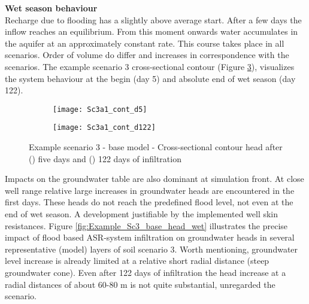 \textbf{Wet season behaviour} \\
Recharge due to flooding has a slightly above average start. After a few days the inflow reaches an equilibrium. From this moment onwards water accumulates in the aquifer at an approximately constant rate. This course takes place in all scenarios. Order of volume do differ and increases in correspondence with the scenarios. The example scenario 3 cross-sectional contour (Figure \ref{fig:Example_Sc3_base_cont_wet}), visualizes the system behaviour at the begin (day 5) and absolute end of wet season (day 122).

\begin{figure}[h!]
	\centering
	\begin{subfigure}[b]{0.5\linewidth}
		\centering\texttt{[image: Sc3a1\_cont\_d5]}
		\captionsetup{justification=centering}		
		\caption{\label{fig:Sc3a1_cont_d5}}
		\end{subfigure}\hfill
	\begin{subfigure}[b]{0.5\linewidth}
        \centering\texttt{[image: Sc3a1\_cont\_d122]}
		\captionsetup{justification=centering}		
		\caption{\label{fig:Sc3a1_cont_d122}}
		\end{subfigure}
		\captionsetup{justification=centering}	
	\caption{Example scenario 3 - base model - Cross-sectional contour head after () five days and () 122 days of infiltration} 
	\label{fig:Example_Sc3_base_cont_wet}
\end{figure} 

Impacts on the groundwater table are also dominant at simulation front. At close well range relative large increases in groundwater heads are encountered in the first days. These heads do not reach the predefined flood level, not even at the end of wet season. A development justifiable by the implemented well skin resistances. Figure \ref{fig:Example_Sc3_base_head_wet} illustrates the precise impact of flood based ASR-system infiltration on groundwater heads in several representative (model) layers of soil scenario 3. Worth mentioning, groundwater level increase is already limited at a relative short radial distance (steep groundwater cone). Even after 122 days of infiltration the head increase at a radial distances of about 60-80 m is not quite substantial, unregarded the scenario.  

